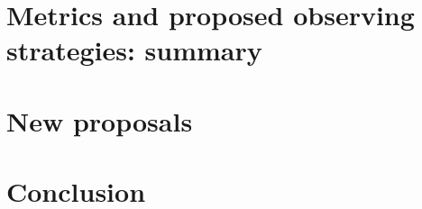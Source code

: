 \documentclass [11pt,a4paper]{article}
\begin{document}




\section{Metrics and proposed observing strategies: summary}
 

\section{New proposals}



\section{Conclusion}





\begin{comment}
\begin{thebibliography}{9}
\expandafter\ifx\csname natexlab\endcsname\relax\def\natexlab#1{#1}\fi
\providecommand{\url}[1]{\href{#1}{#1}}
\providecommand{\dodoi}[1]{doi:~\href{http://doi.org/#1}{\nolinkurl{#1}}}
\providecommand{\doeprint}[1]{\href{http://ascl.net/#1}{\nolinkurl{http://ascl.net/#1}}}
\providecommand{\doarXiv}[1]{\href{https://arxiv.org/abs/#1}{\nolinkurl{https://arxiv.org/abs/#1}}}


\bibitem{perrett} Evolution in the Volumetric Type Ia Supernova Rate from the Supernova Legacy Survey, K.Perrett {\it et al}, The Astronomical Journal, Volume 144, Issue 2 (2012).

\bibitem[Davis et al.(2011)]{2011ApJ...741...67D} Davis, T.~M., Hui, L., Frieman, J.~A., et al.\ 2011, \apj, 741, 67.  
\bibitem[Hui, \& Greene(2006)]{2006PhRvD..73l3526H} Hui, L., \& Greene, P.~B.\ 2006, \prd, 73, 123526.
  
\bibitem[Howlett et al.(2017)]{2017ApJ...847..128H} Howlett, C., Robotham, A.~S.~G., Lagos, C.~D.~P., et al.\ 2017, \apj, 847, 128.

  
  
 \end{thebibliography}
\end{comment}

\clearpage


\appendix
  


\end{document}
